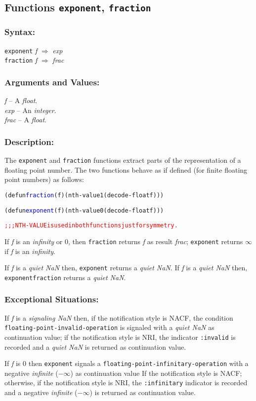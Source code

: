 \documentclass[10pt,fleqn]{article}
\newcommand{\code}[1]{\texttt{#1}}
\newcommand{\clliaterm}[1]{\textit{#1}}
\newcommand{\varname}[1]{\textit{#1}}
\newcommand{\clterm}[1]{\textit{#1}}
\newcommand{\codelia}[1]{\textcolor{blue}{#1}}
\newcommand{\RArrow}{$\Rightarrow$}
\newcommand{\DDictionaryItem}[1]{\vspace*{6pt}\noindent\hrulefill\vspace*{-9pt}\subsection*{#1}}
\newcommand{\DSyntax}{\subsubsection*{Syntax:}}
\newcommand{\DArgsNValues}{\subsubsection*{Arguments and Values:}}
\newcommand{\DDescription}{\subsubsection*{Description:}}
\newcommand{\DExceptional}{\subsubsection*{Exceptional Situations:}}
\begin{document}
\DDictionaryItem{Functions \code{exponent}, \code{fraction}}
\index{E!\code{exponent}}
\index{F!\code{fraction}}

\DSyntax{}

\code{exponent} \varname{f} \RArrow{} \varname{exp}\\
\code{fraction} \varname{f} \RArrow{} \varname{frac}\\


\DArgsNValues{}

\varname{f} -- A \clterm{float}.\\
\varname{exp} -- An \clterm{integer}.\\
\varname{frac} -- A \clterm{float}.

\DDescription{}

The \code{exponent} and \code{fraction} functions extract parts of the
representation of a floating point number.  The two functions behave
as if defined (for finite floating point numbers) as follows:

\begin{alltt}
  (defun \codelia{fraction} (f) (nth-value 1 (decode-float f)))
  
  (defun \codelia{exponent} (f) (nth-value 0 (decode-float f)))
  
  \textcolor{red}{;;; NTH-VALUE is used in both functions just for symmetry.}
\end{alltt}

If \varname{f} is an \clliaterm{infinity} or $0$, then \code{fraction}
returns \varname{f} as result \varname{frac}; \code{exponent}
returns $\infty$ if \varname{f} is an \clliaterm{infinity}.

If \varname{f} is a \clliaterm{quiet NaN} then, \code{exponent}
returns a \clliaterm{quiet NaN}.  If \varname{f} is a \clliaterm{quiet
  NaN} then, \code{exponentfraction} returns a \clliaterm{quiet NaN}.

\DExceptional{}

If \varname{f} is a \clliaterm{signaling NaN} then, if the notification
style is NACF, the condition\\
\code{floating-point-invalid-operation} is signaled with a
\clliaterm{quiet NaN} as continuation value; if the notification style
is NRI, the indicator \code{:invalid} is recorded and a
\clliaterm{quiet NaN} is returned as continuation value.

If \varname{f} is $0$ then \code{exponent} signals a
\code{floating-point-infinitary-operation} with a negative
\clliaterm{infinite} ($-\infty$) as continuation value If the
notification style is NACF; otherwise, if the notification style is
NRI, the \code{:infinitary} indicator is recorded and a negative
\clliaterm{infinite} ($-\infty$) is returned as continuation value.
\end{document}
